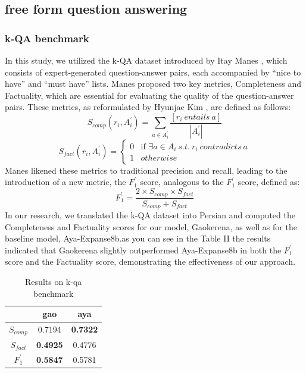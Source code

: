 \documentclass[conference]{IEEEtran}
\begin{document}
\subsection{free form question answering}
\subsubsection{k-QA benchmark}
In this study, we utilized the k-QA dataset introduced by Itay Manes
\cite{b18}
, which consists of expert-generated question-answer pairs, each accompanied by “nice to have” and “must have” lists. Manes proposed two key metrics, Completeness and Factuality, which are essential for evaluating the quality of the question-answer pairs. These metrics, as reformulated by Hyunjae Kim
\cite{b8}
, are defined as follows:  
\[
S_{comp}(r_i,A_i^{\prime}) =  \sum_{a \in A_i^{\prime}} \frac{[r_i \: entails \: a]}{|A_i^{\prime}|}
\]
\[
S_{fact}(r_i,A_i^{\prime}) = 
\begin{cases} 
	0 & \text{if } \exists a \in A_i \: s.t.  \: r_i \: contradicts \: a\\ 
	1 & otherwise
\end{cases}
\]
Manes likened these metrics to traditional precision and recall, leading to the introduction of a new metric, the $F_{1}^{\prime}$ score, analogous to the $F_{1}^{\prime}$ score, defined as: 
\[
F_{1}^{\prime} = \frac{2 \times S_{comp} \times S_{fact}}{S_{comp} + S_{fact}}
\]
In our research, we translated the k-QA dataset into Persian and computed the Completeness and Factuality scores for our model, Gaokerena, as well as for the baseline model, Aya-Expanse8b.as you can see in the Table II the results indicated that Gaokerena slightly outperformed Aya-Expanse8b in both the $F_{1}^{\prime}$ score and the Factuality score, demonstrating the effectiveness of our approach.

\begin{table}[ht]
	\centering
	\caption{Results on k-qa benchmark}
	\begin{tabular}{|c|c|c|} %
		\hline
		\textbf{} & \textbf{gao} & \textbf{aya} \\ 
		\hline
		$S_{comp}$ & 0.7194 & \textbf{0.7322} \\ 
		\hline
		$S_{fact}$ & \textbf{0.4925} & 0.4776 \\ 
		\hline
		$F_{1}^{\prime}$ & \textbf{0.5847} & 0.5781 \\ 
		\hline
	\end{tabular}
	\label{tab:model_accuracy}
\end{table}
\end{document}
